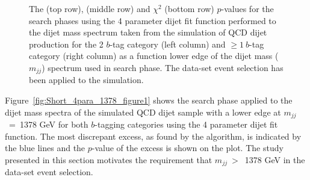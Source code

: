 \begin{figure}[!htb]
\begin{center}
  \end{center}
  \caption{The \bh{} (top row),  \dhunt{} (middle row) and $\chi^{2}$ (bottom row) \mbox{$p$-value}s
    for the search phases using the 4 parameter dijet fit function
    performed to the dijet mass spectrum taken from the simulation of QCD dijet production
    for the 2 $b$-tag category (left column) and $\geq1~b$-tag category (right column)
    as a function lower edge of the dijet mass ($m_{jj}$) spectrum used in search phase.
    The \summer{} data-set event selection has been applied to the simulation.}
  \label{fig:mjjGraphs}
\end{figure}

Figure~\ref{fig:Short_4para_1378_figure1} shows the search phase applied to the dijet mass spectra
of the simulated QCD dijet sample with a lower edge at $m_{jj}$~=~1378 GeV for both $b$-tagging categories
 using the 4 parameter dijet fit function.
The most discrepant excess, as found by the \bh{} algorithm, is indicated by the blue lines
and the \mbox{$p$-value} of the excess is shown on the plot.
The study presented in this section motivates the requirement that $m_{jj}~>$~1378 GeV in the \summer{} data-set event selection.

